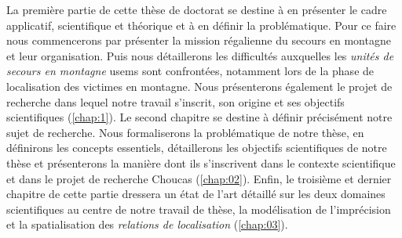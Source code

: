 La première partie de cette thèse de doctorat se destine à en
présenter le cadre applicatif, scientifique et théorique et à en
définir la problématique. Pour ce faire nous commencerons par
présenter la mission régalienne du secours en montagne et leur
organisation. Puis nous détaillerons les difficultés auxquelles les
\emph{unités de secours en montagne} \acp{usem} sont confrontées,
notamment lors de la phase de localisation des victimes en
montagne. Nous présenterons également le projet de recherche dans
lequel notre travail s'inscrit, son origine et ses objectifs
scientifiques (\autoref{chap:1}). Le second chapitre se destine à
définir précisément notre sujet de recherche. Nous formaliserons la
problématique de notre thèse, en définirons les concepts essentiels,
détaillerons les objectifs scientifiques de notre thèse et
présenterons la manière dont ils s'inscrivent dans le contexte
scientifique et dans le projet de recherche Choucas
(\autoref{chap:02}). Enfin, le troisième et dernier chapitre de cette
partie dressera un état de l'art détaillé sur les deux domaines
scientifiques au centre de notre travail de thèse, la modélisation de
l'imprécision et la spatialisation des \emph{relations de
  localisation} (\autoref{chap:03}).

